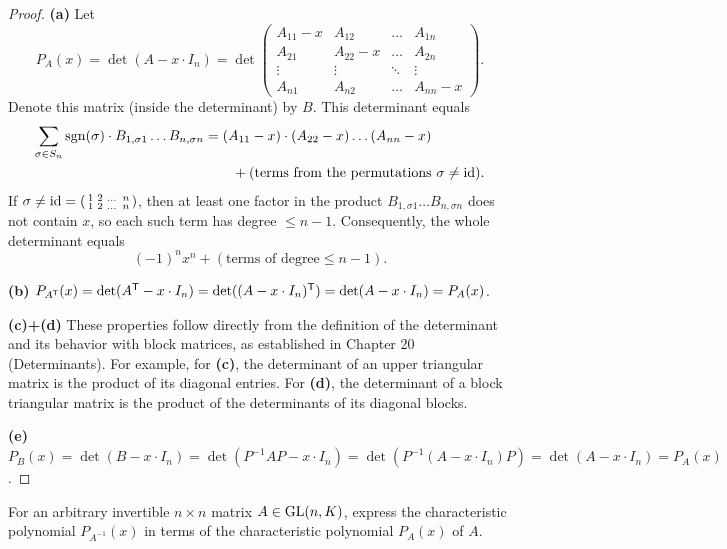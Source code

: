 \begin{proof}
  \textbf{(a)} Let
  \[P_A(x) = \det(A - x \cdot I_n) = \det\begin{pmatrix} A_{11}-x & A_{12} & \dots & A_{1n} \\ A_{21} & A_{22}-x & \dots & A_{2n} \\ \vdots & \vdots & \ddots & \vdots \\ A_{n1} & A_{n2} & \dots & A_{nn}-x \end{pmatrix}. \]
  Denote this matrix (inside the determinant) by $B$. This determinant equals
  \begin{align*}
    \sum_{\sigma \in S_n} \operatorname{sgn}(\sigma) \cdot B_{1, \sigma 1} \dots B_{n, \sigma n}
    & = (A_{11}-x) \cdot (A_{22}-x) \dots (A_{nn}-x) \\
    & \qquad + (\text{terms from the permutations } \sigma \ne \operatorname{id}).
  \end{align*}
  If $\sigma \ne \operatorname{id} = \left(\begin{smallmatrix} 1 & 2 & \dots & n \\ 1 & 2 & \dots & n \end{smallmatrix}\right)$, then at least one factor in the product $B_{1, \sigma 1} \dots B_{n, \sigma n}$ does not contain $x$, so each such term has degree $\le n-1$. Consequently, the whole determinant equals
  \[ (-1)^n x^n + (\text{terms of degree} \le n-1). \]

  \textbf{(b)} $P_{A^{\mathsf{T}}}(x) = \det(A^{\mathsf{T}} - x \cdot I_n) = \det((A - x \cdot I_n)^{\mathsf{T}}) = \det(A - x \cdot I_n) = P_A(x)$.

  \textbf{(c)+(d)} These properties follow directly from the definition of the determinant and its behavior with block matrices, as established in Chapter 20 (Determinants). For example, for \textbf{(c)}, the determinant of an upper triangular matrix is the product of its diagonal entries. For \textbf{(d)}, the determinant of a block triangular matrix is the product of the determinants of its diagonal blocks.

  \textbf{(e)} $P_B(x) = \det(B - x \cdot I_n) = \det(P^{-1}AP - x \cdot I_n) = \det(P^{-1}(A - x \cdot I_n)P) = \det(A - x \cdot I_n) = P_A(x)$.
\end{proof}

\begin{exercise}
  \label{exc:char_poly_inverse_matrix}
  For an arbitrary invertible $n \times n$ matrix $A \in \operatorname{GL}(n, K)$, express the characteristic polynomial $P_{A^{-1}}(x)$ in terms of the characteristic polynomial $P_A(x)$ of $A$.
\end{exercise}

